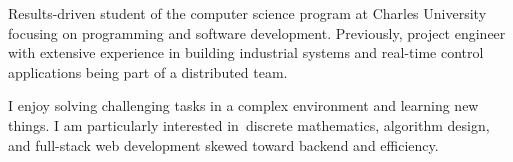 Results-driven student of the computer science program at Charles University focusing on programming and software development. Previously, project engineer with extensive experience in building industrial systems and real-time control applications being part of a distributed team.

I enjoy solving challenging tasks in a complex environment and learning new things. I am particularly interested in~dis\-crete mathematics, algorithm design, and full-stack web development skewed toward backend and efficiency.
